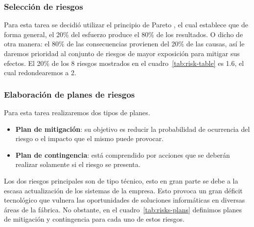 \documentclass[a4paper,12pt]{article}
\begin{document}
\clearpage

\subsubsection{Selección de riesgos}
Para esta tarea se decidió utilizar el principio de Pareto \citep{pareto}, el cual establece que de forma general, el 20\% del esfuerzo produce el 80\% de los resultados. O dicho de otra manera: el 80\% de las consecuencias provienen del 20\% de las causas, así  le daremos prioridad al conjunto de riesgos de mayor exposición para mitigar sus efectos. El 20\% de los 8 riesgos mostrados en el cuadro~\ref{tab:risk-table} es 1.6, el cual redondearemos a 2.

\subsubsection{Elaboración de planes de riesgos}
Para esta tarea realizaremos dos tipos de planes.
\begin{itemize}[noitemsep]
	\item \textbf{Plan de mitigación}: su objetivo es reducir la probabilidad de ocurrencia del riesgo o el impacto que el mismo puede provocar.
	\item \textbf{Plan de contingencia}: está comprendido por acciones que se deberán realizar solamente si el riesgo se presenta.	
\end{itemize}

Los dos riesgos principales son de tipo técnico, esto en gran parte se debe a la escasa actualización de los sistemas de la empresa. Esto provoca un gran déficit tecnológico que vulnera las oportunidades de soluciones informáticas en diversas áreas de la fábrica. No obstante, en el cuadro~\ref{tab:risks-plans} definimos planes de mitigación y contingencia para cada uno de estos riesgos.
\end{document}

